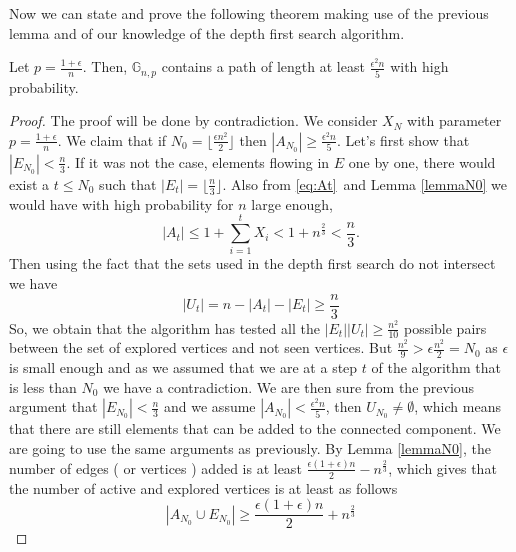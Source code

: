 Now we can state and prove the following theorem making use of the previous lemma and of our knowledge of the depth first search algorithm.
\begin{theorem}
	Let $p = \frac{1+\epsilon}{n}$. Then, $\mathbb{G}_{n,p}$ contains a path of length at least $\frac{\epsilon^2n}{5}$ with high probability.
\end{theorem}
\begin{proof}
	The proof will be done by contradiction.
	\newline
	We consider $X_N$ with parameter $p = \frac{1+\epsilon}{n}$. We claim that if $N_0 = \lfloor\frac{\epsilon n^2}{2} \rfloor$ then $|A_{N_0}| \geq \frac{\epsilon^2 n}{5}$.
	\newline
	Let's first show that $|E_{N_0}| < \frac{n}{3}$.
	\newline
	If it was not the case, elements flowing in $E$ one by one, there would exist a $t \leq N_0$ such that $|E_t| = \lfloor\frac{n}{3}\rfloor$. 
	Also from \eqref{eq:At} and Lemma \ref{lemmaN0} we would have with high probability for $n$ large enough,
	\begin{equation}
		|A_t| \leq 1 + \sum_{i=1}^{t} X_i < 1 + n^{\frac{2}{3}} < \frac{n}{3}.
	\end{equation}
	Then using the fact that the sets used in the depth first search do not intersect we have
	\begin{equation}
		|U_t| = n - |A_t| - |E_t| \geq \frac{n}{3}
	\end{equation}
	So, we obtain that the algorithm has tested all the $|E_t||U_t| \geq \frac{n^2}{10}$ possible pairs between the set of explored vertices and not seen vertices.
	But $\frac{n^2}{9} > \epsilon\frac{n^2}{2} = N_0$ as $\epsilon$ is small enough and as we assumed that we are at a step $t$ of the algorithm that is less than $N_0$ we have a contradiction. 
	\newline
	We are then sure from the previous argument that $|E_{N_0}| < \frac{n}{3}$ and we assume $|A_{N_0}| < \frac{\epsilon^2 n}{5}$, then $U_{N_0} \neq \emptyset$, 
	which means that there are still elements that can be added to the connected component.
	We are going to use the same arguments as previously.
	\newline
	By Lemma \eqref{lemmaN0}, the number of edges ( or vertices ) added is at least $\frac{\epsilon(1+\epsilon)n}{2} - n^{\frac{2}{3}}$,
	which gives that the number of active and explored vertices is at least as follows
	\begin{equation}
		|A_{N_0} \cup E_{N_0}| \geq \frac{\epsilon(1+\epsilon)n}{2} + n^{\frac{2}{3}}

\end{equation}
\end{proof}
